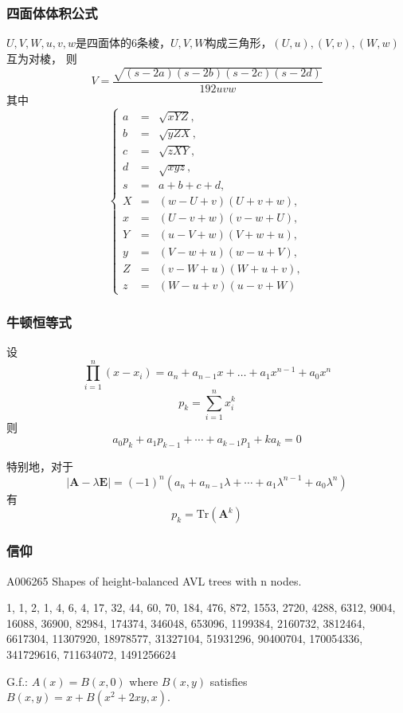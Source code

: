 \subsubsection{四面体体积公式}

$U, V, W, u, v, w$是四面体的$6$条棱，$U, V, W$构成三角形，$(U, u), (V, v), (W, w)$互为对棱，
则$$V = \frac{\sqrt{(s - 2a)(s - 2b)(s - 2c)(s - 2d)}}{192 uvw}$$
其中$$\left\{\begin{array}{lll}
a & = & \sqrt{xYZ}, \\
b & = & \sqrt{yZX}, \\
c & = & \sqrt{zXY}, \\
d & = & \sqrt{xyz}, \\
s & = & a + b + c + d, \\
X & = & (w - U + v)(U + v + w), \\
x & = & (U - v + w)(v - w + U), \\
Y & = & (u - V + w)(V + w + u), \\
y & = & (V - w + u)(w - u + V), \\
Z & = & (v - W + u)(W + u + v), \\
z & = & (W - u + v)(u - v + W)
\end{array}\right.$$

\subsubsection{牛顿恒等式}

设$$\prod_{i = 1}^n{(x - x_i)} = a_n + a_{n - 1} x + \dots + a_1 x^{n - 1} + a_0 x^n$$
$$p_k = \sum_{i = 1}^n{x_i^k}$$
则$$a_0 p_k + a_1 p_{k - 1} + \cdots + a_{k - 1} p_1 + k a_k = 0$$

特别地，对于$$|\mathbf{A} - \lambda \mathbf{E}| = (-1)^n(a_n + a_{n - 1} \lambda + \cdots + a_1 \lambda^{n - 1} + a_0 \lambda^n)$$
有$$p_k = \mathrm{Tr}(\mathbf{A}^k)$$

\subsubsection{信仰}
A006265 		Shapes of height-balanced AVL trees with n nodes.

1, 1, 2, 1, 4, 6, 4, 17, 32, 44, 60, 70, 184, 476, 872, 1553, 2720, 4288, 6312, 9004, 16088, 36900, 82984, 174374, 346048, 653096, 1199384, 2160732, 3812464, 6617304, 11307920, 18978577, 31327104, 51931296, 90400704, 170054336, 341729616, 711634072, 1491256624

G.f.: $A(x) = B(x,0)$ where $B(x,y)$ satisfies $B(x,y) = x + B(x^2+2xy,x)$.
